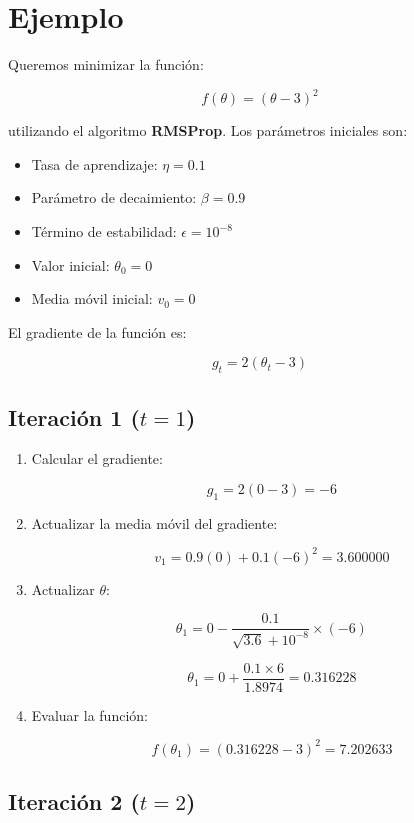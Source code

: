 \documentclass{article}
\begin{document}
\section*{Ejemplo}
Queremos minimizar la función:

\[
f(\theta) = (\theta - 3)^2
\]

utilizando el algoritmo \textbf{RMSProp}. Los parámetros iniciales son:

\begin{itemize}
	\item Tasa de aprendizaje: \( \eta = 0.1 \)
	\item Parámetro de decaimiento: \( \beta = 0.9 \)
	\item Término de estabilidad: \( \epsilon = 10^{-8} \)
	\item Valor inicial: \( \theta_0 = 0 \)
	\item Media móvil inicial: \( v_0 = 0 \)
\end{itemize}

El gradiente de la función es:

\[
g_t = 2(\theta_t - 3)
\]


\subsection*{Iteración 1 (\( t = 1 \))}

\begin{enumerate}
	\item Calcular el gradiente:
	
	\[
	g_1 = 2(0 - 3) = -6
	\]
	
	\item Actualizar la media móvil del gradiente:
	
	\[
	v_1 = 0.9(0) + 0.1(-6)^2 = 3.600000
	\]
	
	\item Actualizar \( \theta \):
	
	\[
	\theta_1 = 0 - \frac{0.1}{\sqrt{3.6} + 10^{-8}} \times (-6)
	\]
	
	\[
	\theta_1 = 0 + \frac{0.1 \times 6}{1.8974} = 0.316228
	\]
	
	\item Evaluar la función:
	
	\[
	f(\theta_1) = (0.316228 - 3)^2 = 7.202633
	\]
\end{enumerate}

\subsection*{Iteración 2 (\( t = 2 \))}
\end{document}
